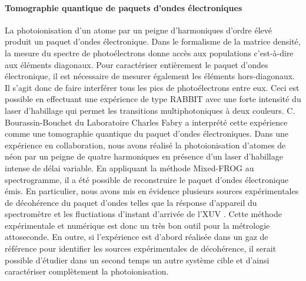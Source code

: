 \paragraph*{Tomographie quantique de paquets d'ondes électroniques} La photoionisation d'un atome par un peigne d'harmoniques d'ordre élevé produit un paquet d'ondes électronique. Dans le formalisme de la matrice densité, la mesure du spectre de photoélectrons donne accès aux populations c'est-à-dire aux éléments diagonaux. Pour caractériser entièrement le paquet d'ondes électronique, il est nécessaire de mesurer également les éléments hors-diagonaux. Il s'agit donc de faire interférer tous les pics de photoélectrons entre eux. Ceci est possible en effectuant une expérience de type RABBIT avec une forte intensité du laser d'habillage qui permet les transitions multiphotoniques à deux couleurs. C. Bourassin-Bouchet du Laboratoire Charles Fabry a interprété cette expérience comme une tomographie quantique du paquet d'ondes électroniques. Dans une expérience en collaboration, nous avons réalisé la photoionisation d'atomes de néon par un peigne de quatre harmoniques en présence d'un laser d'habillage intense de délai variable. En appliquant la méthode Mixed-FROG  au spectrogramme, il a été possible de reconstruire le paquet d'ondes électronique émis. En particulier, nous avons mis en évidence plusieurs sources expérimentales de décohérence du paquet d'ondes telles que la résponse d'appareil du spectromètre et les fluctiations d'instant d'arrivée de l'XUV . Cette méthode expérimentale et numérique est donc un très bon outil pour la métrologie attoseconde. En outre, si l'expérience est d'abord réalisée dans un gaz de référence pour identifier les sources expérimentales de décohérence, il serait possible d'étudier dans un second temps un autre système cible et d'ainsi caractériser complètement la photoionisation.






